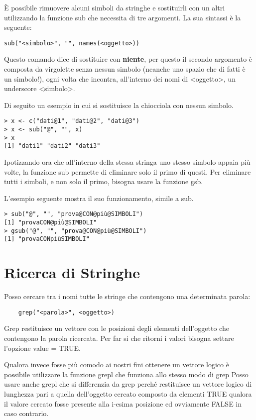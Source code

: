 È possibile rimuovere alcuni simboli da stringhe e sostituirli con un altri utilizzando la funzione \textsf{sub} che necessita di tre argomenti. La sua sintassi è la seguente:
\begin{lstlisting}
sub("<simbolo>", "", names(<oggetto>))
\end{lstlisting}
Questo comando dice di sostituire con \textbf{niente}, per questo il secondo argomento è composta da virgolette senza nessun simbolo (neanche uno spazio che di fatti è un simbolo!), ogni volta che incontra, all'interno dei nomi di <oggetto>, un underscore <simbolo>.

Di seguito un esempio in cui si sostituisce la chiocciola con nessun simbolo.
\begin{lstlisting}
> x <- c("dati@1", "dati@2", "dati@3")
> x <- sub("@", "", x)
> x
[1] "dati1" "dati2" "dati3"
\end{lstlisting}

Ipotizzando ora che all'interno della stessa stringa uno stesso simbolo appaia più volte, la funzione \textsf{sub} permette di eliminare solo il primo di questi. Per eliminare tutti i simboli, e non solo il primo, bisogna usare la funzione \textsf{gsb}.

L'esempio seguente mostra il suo funzionamento, simile a \textsf{sub}.

\begin{lstlisting}
> sub("@", "", "prova@CON@più@SIMBOLI")
[1] "provaCON@più@SIMBOLI"
> gsub("@", "", "prova@CON@più@SIMBOLI")
[1] "provaCONpiùSIMBOLI"
\end{lstlisting}


\section{Ricerca di Stringhe}
Posso cercare tra i nomi tutte le stringe che contengono una determinata parola:
\begin{lstlisting}
	grep("<parola>", <oggetto>)
\end{lstlisting}
Grep restituisce un vettore con le posizioni degli elementi dell’oggetto che contengono la parola ricercata. Per far si che ritorni i valori bisogna settare l’opzione value = TRUE.

Qualora invece fosse più comodo ai nostri fini ottenere un vettore logico è possibile utilizzare la funzione grepl che funziona allo stesso modo di grep 
Posso usare anche grepl che si differenzia da grep perché restituisce un vettore logico di lunghezza pari a quella dell’oggetto cercato composto da elementi TRUE qualora il valore cercato fosse presente alla i-esima posizione ed ovviamente FALSE in caso contrario.

